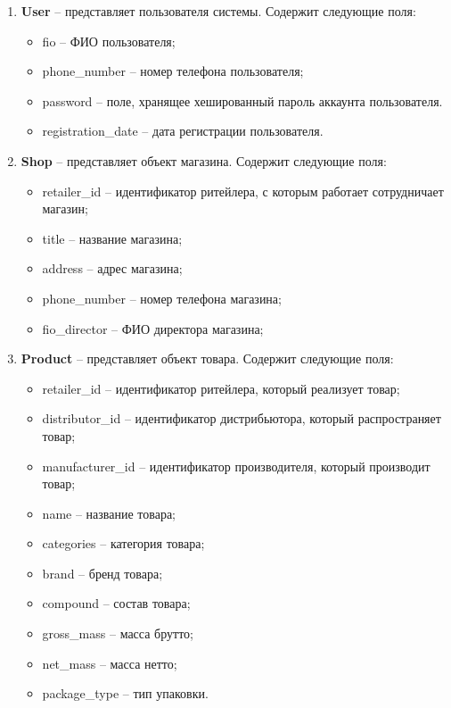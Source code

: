 \begin{enumerate}
	\item \textbf{User} -- представляет пользователя системы. Содержит следующие поля: 
	\begin{itemize}
		\item fio -- ФИО пользователя;
		\item phone\_number -- номер телефона пользователя;
		\item password -- поле, хранящее хешированный пароль аккаунта пользователя.
		\item registration\_date -- дата  регистрации пользователя.
	\end{itemize}
	
	\item \textbf{Shop} -- представляет объект магазина. Содержит следующие поля: 
	\begin{itemize}
		\item retailer\_id -- идентификатор ритейлера, с которым работает сотрудничает магазин;
		\item title -- название магазина;
		\item address -- адрес магазина;
		\item phone\_number -- номер телефона магазина;
		\item fio\_director -- ФИО директора магазина;
	\end{itemize}
	
	\item \textbf{Product} -- представляет объект товара. Содержит следующие поля: 
	\begin{itemize}
		\item retailer\_id -- идентификатор ритейлера, который реализует товар;
		\item distributor\_id -- идентификатор дистрибьютора, который распространяет товар;
		\item manufacturer\_id -- идентификатор производителя, который производит товар;
		\item name -- название товара;
		\item categories -- категория товара;
		\item brand -- бренд товара;
		\item compound -- состав товара;
		\item gross\_mass -- масса брутто;
		\item net\_mass -- масса нетто;
		\item package\_type -- тип упаковки.
	\end{itemize}
	

\end{enumerate}
